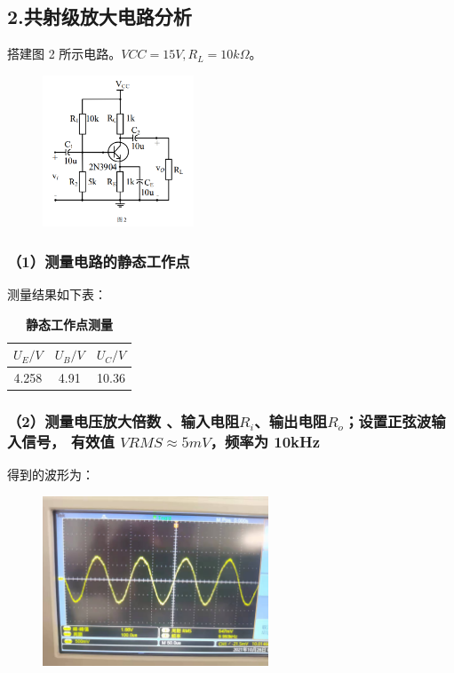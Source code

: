 \documentclass[UTF8]{ctexart}
\begin{document}
\subsection*{2.共射级放大电路分析}
搭建图 2 所示电路。$VCC = 15V, R_L = 10k \Omega$。

\begin{figure}[htbp]
    \centering
    \includegraphics[width=0.40\textwidth]{2-电路图.png}
\end{figure}

\subsubsection*{（1）测量电路的静态工作点}

测量结果如下表：

\begin{table}[H]
    \centering
    \caption{\label{表3}\textbf{静态工作点测量}}
    \begin{tabular}{ccc}
    \toprule
            $U_E/V$ & $U_B/V$ &  $U_C/V$\\
    \midrule
            4.258 & 4.91 & 10.36\\            
    \bottomrule
    \end{tabular}
\end{table}

\subsubsection*{（2）测量电压放大倍数 、输入电阻$R_i$、输出电阻$R_o$；设置正弦波输入信号，
有效值 $VRMS \approx 5mV$，频率为 10kHz}

得到的波形为：
\begin{figure}[htbp]
    \centering
    \includegraphics[width=0.60\textwidth]{2-2.jpg}
\end{figure}
\end{document}
